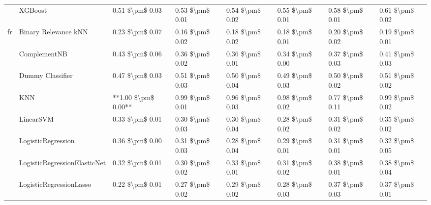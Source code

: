 \begin{tabular}{llllllll}
   & XGBoost &      0.51 \$\textbackslash pm\$ 0.03 &           0.53 \$\textbackslash pm\$ 0.01 &       0.54 \$\textbackslash pm\$ 0.02 &        0.55 \$\textbackslash pm\$ 0.01 &                         0.58 \$\textbackslash pm\$ 0.01 &      0.61 \$\textbackslash pm\$ 0.02 \\
fr & Binary Relevance kNN &      0.23 \$\textbackslash pm\$ 0.07 &           0.16 \$\textbackslash pm\$ 0.02 &       0.18 \$\textbackslash pm\$ 0.02 &        0.18 \$\textbackslash pm\$ 0.01 &                         0.20 \$\textbackslash pm\$ 0.02 &      0.19 \$\textbackslash pm\$ 0.01 \\
   & ComplementNB &      0.43 \$\textbackslash pm\$ 0.06 &           0.36 \$\textbackslash pm\$ 0.02 &       0.36 \$\textbackslash pm\$ 0.01 &        0.34 \$\textbackslash pm\$ 0.00 &                         0.37 \$\textbackslash pm\$ 0.03 &      0.41 \$\textbackslash pm\$ 0.03 \\
   & Dummy Classifier &      0.47 \$\textbackslash pm\$ 0.03 &           0.51 \$\textbackslash pm\$ 0.03 &       0.50 \$\textbackslash pm\$ 0.04 &        0.49 \$\textbackslash pm\$ 0.03 &                         0.50 \$\textbackslash pm\$ 0.02 &      0.51 \$\textbackslash pm\$ 0.02 \\
   & KNN &  **1.00 \$\textbackslash pm\$ 0.00** &           0.99 \$\textbackslash pm\$ 0.01 &       0.96 \$\textbackslash pm\$ 0.03 &        0.98 \$\textbackslash pm\$ 0.02 &                         0.77 \$\textbackslash pm\$ 0.11 &      0.99 \$\textbackslash pm\$ 0.02 \\
   & LinearSVM &      0.33 \$\textbackslash pm\$ 0.01 &           0.30 \$\textbackslash pm\$ 0.03 &       0.30 \$\textbackslash pm\$ 0.04 &        0.28 \$\textbackslash pm\$ 0.02 &                         0.31 \$\textbackslash pm\$ 0.02 &      0.35 \$\textbackslash pm\$ 0.02 \\
   & LogisticRegression &      0.36 \$\textbackslash pm\$ 0.00 &           0.31 \$\textbackslash pm\$ 0.03 &       0.28 \$\textbackslash pm\$ 0.04 &        0.29 \$\textbackslash pm\$ 0.01 &                         0.31 \$\textbackslash pm\$ 0.01 &      0.32 \$\textbackslash pm\$ 0.05 \\
   & LogisticRegressionElasticNet &      0.32 \$\textbackslash pm\$ 0.01 &           0.30 \$\textbackslash pm\$ 0.02 &       0.33 \$\textbackslash pm\$ 0.01 &        0.31 \$\textbackslash pm\$ 0.02 &                         0.38 \$\textbackslash pm\$ 0.01 &      0.38 \$\textbackslash pm\$ 0.04 \\
   & LogisticRegressionLasso &      0.22 \$\textbackslash pm\$ 0.01 &           0.27 \$\textbackslash pm\$ 0.02 &       0.29 \$\textbackslash pm\$ 0.02 &        0.28 \$\textbackslash pm\$ 0.03 &                         0.37 \$\textbackslash pm\$ 0.03 &      0.37 \$\textbackslash pm\$ 0.01 \\

\end{tabular}
